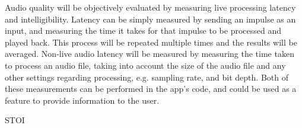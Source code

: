 Audio quality will be objectively evaluated by measuring live processing latency and intelligibility.
Latency can be simply measured by sending an impulse as an input, and measuring the time it takes for that impulse to be processed and played back.
This process will be repeated multiple times and the results will be averaged. 
Non-live audio latency will be measured by measuring the time taken to process an audio file, taking into account the size of the audio file and any other settings regarding processing, e.g. sampling rate, and bit depth.
Both of these measurements can be performed in the app's code, and could be used as a feature to provide information to the user.

STOI 
